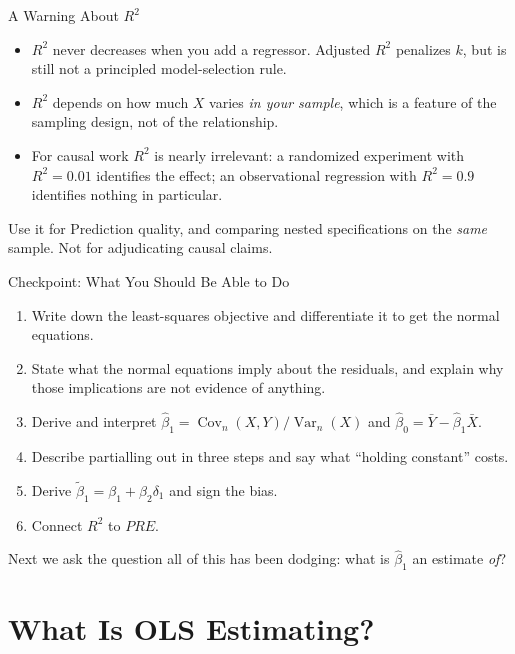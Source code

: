 \documentclass[aspectratio=169,11pt,xcolor=dvipsnames]{beamer}
\DeclareMathOperator{\Cov}{Cov}
\DeclareMathOperator{\Var}{Var}
\begin{document}
\begin{frame}{A Warning About $R^2$}
\begin{itemize}\itemsep4pt
  \item $R^2$ never decreases when you add a regressor. Adjusted $R^2$ penalizes
        $k$, but is still not a principled model-selection rule.
  \item $R^2$ depends on how much $X$ varies \emph{in your sample}, which is a
        feature of the sampling design, not of the relationship.
  \item For causal work $R^2$ is nearly irrelevant: a randomized experiment with
        $R^2 = 0.01$ identifies the effect; an observational regression with
        $R^2 = 0.9$ identifies nothing in particular.
\end{itemize}
\vskip6pt
\begin{block}{Use it for}
Prediction quality, and comparing nested specifications on the \emph{same} sample.
Not for adjudicating causal claims.
\end{block}
\end{frame}

\begin{frame}{Checkpoint: What You Should Be Able to Do}
\begin{enumerate}\itemsep4pt
  \item Write down the least-squares objective and differentiate it to get the
        normal equations.
  \item State what the normal equations imply about the residuals, and explain
        why those implications are not evidence of anything.
  \item Derive and interpret
        $\hat\beta_1 = \Cov_n(X,Y)/\Var_n(X)$ and
        $\hat\beta_0 = \bar Y - \hat\beta_1\bar X$.
  \item Describe partialling out in three steps and say what ``holding constant''
        costs.
  \item Derive $\tilde\beta_1 = \beta_1 + \beta_2\delta_1$ and sign the bias.
  \item Connect $R^2$ to $PRE$.
\end{enumerate}
\vskip6pt
\alert{Next we ask the question all of this has been dodging: what is
$\hat\beta_1$ an estimate \emph{of}?}
\end{frame}

\section[CEF and BLP]{What Is OLS Estimating?}
\begin{frame}\sectionpage\end{frame}
\end{document}
